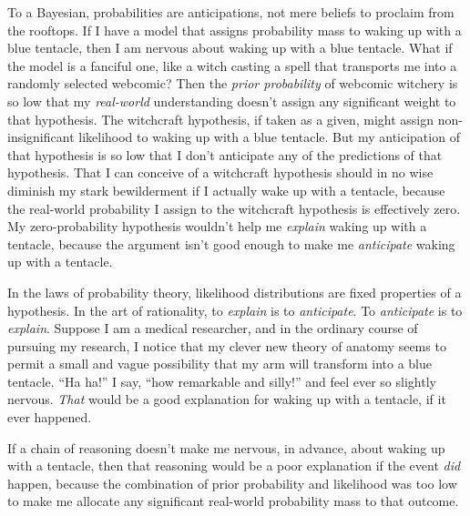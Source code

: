 {
 To a Bayesian, probabilities are anticipations, not mere beliefs
to proclaim from the rooftops. If I have a model that assigns
probability mass to waking up with a blue tentacle, then I am nervous
about waking up with a blue tentacle. What if the model is a fanciful
one, like a witch casting a spell that transports me into a randomly
selected webcomic? Then the \textit{prior probability} of webcomic
witchery is so low that my \textit{real-world} understanding
doesn't assign any significant weight to that
hypothesis. The witchcraft hypothesis, if taken as a given, might
assign non-insignificant likelihood to waking up with a blue tentacle.
But my anticipation of that hypothesis is so low that I
don't anticipate any of the predictions of that
hypothesis. That I can conceive of a witchcraft hypothesis should in no
wise diminish my stark bewilderment if I actually wake up with a
tentacle, because the real-world probability I assign to the witchcraft
hypothesis is effectively zero. My zero-probability hypothesis
wouldn't help me \textit{explain} waking up with a
tentacle, because the argument isn't good enough to
make me \textit{anticipate} waking up with a tentacle.}

{
 In the laws of probability theory, likelihood distributions are
fixed properties of a hypothesis. In the art of rationality, to
\textit{explain} is to \textit{anticipate}. To \textit{anticipate} is
to \textit{explain}. Suppose I am a medical researcher, and in the
ordinary course of pursuing my research, I notice that my clever new
theory of anatomy seems to permit a small and vague possibility that my
arm will transform into a blue tentacle. ``Ha
ha!'' I say, ``how remarkable and
silly!'' and feel ever so slightly nervous.
\textit{That} would be a good explanation for waking up with a
tentacle, if it ever happened.}

{
 If a chain of reasoning doesn't make me nervous,
in advance, about waking up with a tentacle, then that reasoning would
be a poor explanation if the event \textit{did} happen, because the
combination of prior probability and likelihood was too low to make me
allocate any significant real-world probability mass to that outcome.}

